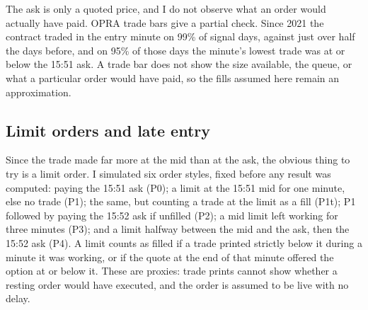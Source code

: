 \documentclass[12pt,letterpaper]{article}
\begin{document}
The ask is only a quoted price, and I do not observe what an order would
actually have paid. OPRA trade bars give a partial check. Since 2021 the
contract traded in the entry minute on 99\% of
signal days, against just over half the days before, and on 95\% of those days
the minute's lowest trade was at or below the 15:51 ask. A trade bar does not
show the size available, the queue, or what a particular order would have paid,
so the fills assumed here remain an approximation.

\subsection{Limit orders and late entry}
\label{sec:fills}

Since the trade made far more at the mid than at the ask, the obvious thing to
try is a limit order. I simulated six order styles, fixed before
any result was computed: paying the 15:51 ask (P0); a limit at the 15:51 mid for
one minute, else no trade (P1); the same, but counting a trade at the limit as a
fill (P1t); P1 followed by paying the 15:52 ask if unfilled (P2); a mid limit left
working for three minutes (P3); and a limit halfway between the mid and the ask,
then the 15:52 ask (P4). A limit counts as filled if a trade printed strictly
below it during a minute it was working, or if the quote at the end of that minute
offered the option at or below it. These are proxies: trade prints cannot show
whether a resting order would have executed, and the order is assumed to be live
with no delay.
\end{document}
